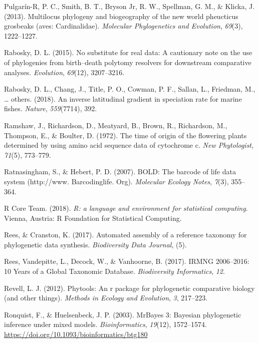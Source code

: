 \documentclass[english,man]{apa6}
\begin{document}
\leavevmode\hypertarget{ref-pulgarin2013multilocus}{}%
Pulgarín-R, P. C., Smith, B. T., Bryson Jr, R. W., Spellman, G. M., \& Klicka, J. (2013). Multilocus phylogeny and biogeography of the new world pheucticus grosbeaks (aves: Cardinalidae). \emph{Molecular Phylogenetics and Evolution}, \emph{69}(3), 1222--1227.

\leavevmode\hypertarget{ref-rabosky2015no}{}%
Rabosky, D. L. (2015). No substitute for real data: A cautionary note on the use of phylogenies from birth--death polytomy resolvers for downstream comparative analyses. \emph{Evolution}, \emph{69}(12), 3207--3216.

\leavevmode\hypertarget{ref-rabosky2018inverse}{}%
Rabosky, D. L., Chang, J., Title, P. O., Cowman, P. F., Sallan, L., Friedman, M., \ldots{} others. (2018). An inverse latitudinal gradient in speciation rate for marine fishes. \emph{Nature}, \emph{559}(7714), 392.

\leavevmode\hypertarget{ref-ramshaw1972time}{}%
Ramshaw, J., Richardson, D., Meatyard, B., Brown, R., Richardson, M., Thompson, E., \& Boulter, D. (1972). The time of origin of the flowering plants determined by using amino acid sequence data of cytochrome c. \emph{New Phytologist}, \emph{71}(5), 773--779.

\leavevmode\hypertarget{ref-ratnasingham2007bold}{}%
Ratnasingham, S., \& Hebert, P. D. (2007). BOLD: The barcode of life data system (http://www. Barcodinglife. Org). \emph{Molecular Ecology Notes}, \emph{7}(3), 355--364.

\leavevmode\hypertarget{ref-RCoreTeam2018}{}%
R Core Team. (2018). \emph{R: a language and environment for statistical computing}. Vienna, Austria: R Foundation for Statistical Computing.

\leavevmode\hypertarget{ref-rees2017automated}{}%
Rees, \& Cranston, K. (2017). Automated assembly of a reference taxonomy for phylogenetic data synthesis. \emph{Biodiversity Data Journal}, (5).

\leavevmode\hypertarget{ref-rees2017irmng}{}%
Rees, Vandepitte, L., Decock, W., \& Vanhoorne, B. (2017). IRMNG 2006--2016: 10 Years of a Global Taxonomic Database. \emph{Biodiversity Informatics}, \emph{12}.

\leavevmode\hypertarget{ref-Revell2012}{}%
Revell, L. J. (2012). Phytools: An r package for phylogenetic comparative biology (and other things). \emph{Methods in Ecology and Evolution}, \emph{3}, 217--223.

\leavevmode\hypertarget{ref-Ronquist2003}{}%
Ronquist, F., \& Huelsenbeck, J. P. (2003). MrBayes 3: Bayesian phylogenetic inference under mixed models. \emph{Bioinformatics}, \emph{19}(12), 1572--1574. \url{https://doi.org/10.1093/bioinformatics/btg180}
\end{document}
